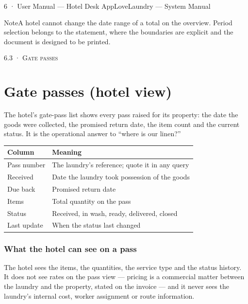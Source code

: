 \documentclass[11pt,a4paper,oneside]{book}
\begin{document}
6 · User Manual — Hotel Desk AppLoveLaundry — System Manual

\begin{notebox}NoteA hotel cannot change the date range of a total on the overview. Period selection belongs to the statement, where the boundaries are explicit and the document is designed to be printed.\end{notebox}
\textsc{\small\color{crimson}6.3 · Gate passes}\par\medskip
\section*{Gate passes (hotel view)}
The hotel's gate-pass list shows every pass raised for its property: the date the goods were collected, the promised return date, the item count and the current status. It is the operational answer to “where is our linen?”

\begin{center}\small
\begin{tabularx}{\linewidth}{|X|X|}
\hline
\rowcolor{lightgrey}
\textbf{Column} & \textbf{Meaning} \\ \hline
Pass number & The laundry's reference; quote it in any query \\ \hline
Received & Date the laundry took possession of the goods \\ \hline
Due back & Promised return date \\ \hline
Items & Total quantity on the pass \\ \hline
Status & Received, in wash, ready, delivered, closed \\ \hline
Last update & When the status last changed \\ \hline
\end{tabularx}
\end{center}
\subsubsection*{What the hotel can see on a pass}
The hotel sees the items, the quantities, the service type and the status history. It does not see rates on the pass view — pricing is a commercial matter between the laundry and the property, stated on the invoice — and it never sees the laundry's internal cost, worker assignment or route information.
\end{document}
